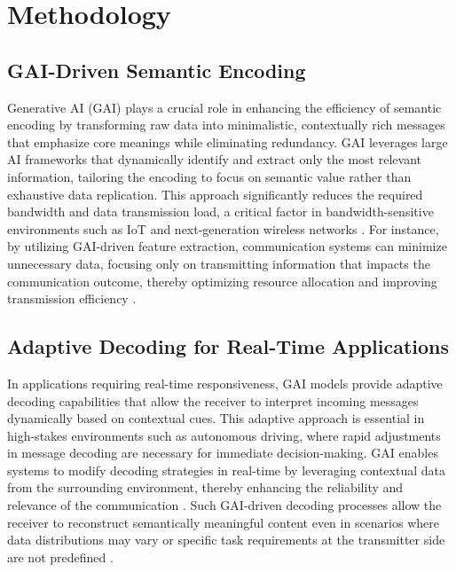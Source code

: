 \documentclass[journal]{IEEEtran}
\begin{document}
\section{Methodology}

\subsection{GAI-Driven Semantic Encoding}
Generative AI (GAI) plays a crucial role in enhancing the efficiency of semantic encoding by transforming raw data into minimalistic, contextually rich messages that emphasize core meanings while eliminating redundancy. GAI leverages large AI frameworks that dynamically identify and extract only the most relevant information, tailoring the encoding to focus on semantic value rather than exhaustive data replication. This approach significantly reduces the required bandwidth and data transmission load, a critical factor in bandwidth-sensitive environments such as IoT and next-generation wireless networks \cite{chaccour2022dataknowledgebuildinggeneration}. For instance, by utilizing GAI-driven feature extraction, communication systems can minimize unnecessary data, focusing only on transmitting information that impacts the communication outcome, thereby optimizing resource allocation and improving transmission efficiency \cite{10634888,10614204}.

\subsection{Adaptive Decoding for Real-Time Applications}
In applications requiring real-time responsiveness, GAI models provide adaptive decoding capabilities that allow the receiver to interpret incoming messages dynamically based on contextual cues. This adaptive approach is essential in high-stakes environments such as autonomous driving, where rapid adjustments in message decoding are necessary for immediate decision-making. GAI enables systems to modify decoding strategies in real-time by leveraging contextual data from the surrounding environment, thereby enhancing the reliability and relevance of the communication \cite{10614204}. Such GAI-driven decoding processes allow the receiver to reconstruct semantically meaningful content even in scenarios where data distributions may vary or specific task requirements at the transmitter side are not predefined \cite{10447237}.
\end{document}
